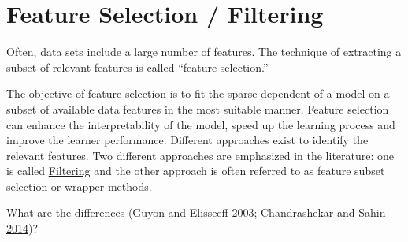 \documentclass[
]{scrbook}
\begin{document}
\hypertarget{fs}{%
\section{Feature Selection / Filtering}\label{fs}}

Often, data sets include a large number of features.
The technique of extracting a subset of relevant features is called ``feature selection.''

The objective of feature selection is to fit the sparse dependent of a model on a subset of available data features in the most suitable manner.
Feature selection can enhance the interpretability of the model, speed up the learning process and improve the learner performance.
Different approaches exist to identify the relevant features.
Two different approaches are emphasized in the literature:
one is called \protect\hyperlink{fs-filter}{Filtering} and the other approach is often referred to as feature subset selection or \protect\hyperlink{fs-wrapper}{wrapper methods}.

What are the differences (\protect\hyperlink{ref-guyon2003}{Guyon and Elisseeff 2003}; \protect\hyperlink{ref-chandrashekar2014}{Chandrashekar and Sahin 2014})?
\end{document}
